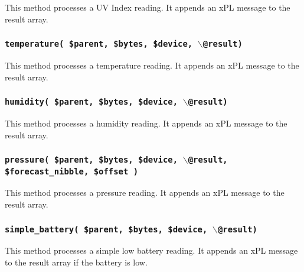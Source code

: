 This method processes a UV Index reading.  It appends an xPL message
to the result array.

\subsubsection*{\texttt{temperature( \$parent, \$bytes, \$device, $\backslash$@result)}\label{xPL::RF::Oregon_temperature_parent_bytes_device_backslash_result_}}


This method processes a temperature reading.  It appends an xPL message
to the result array.

\subsubsection*{\texttt{humidity( \$parent, \$bytes, \$device, $\backslash$@result)}\label{xPL::RF::Oregon_humidity_parent_bytes_device_backslash_result_}}


This method processes a humidity reading.  It appends an xPL message
to the result array.

\subsubsection*{\texttt{pressure( \$parent, \$bytes, \$device, $\backslash$@result, \$forecast\_nibble,
                   \$offset )}\label{xPL::RF::Oregon__texttt_pressure_parent_bytes_device_backslash_result_forecast_nibble_offset_}}


This method processes a pressure reading.  It appends an xPL message
to the result array.

\subsubsection*{\texttt{simple\_battery( \$parent, \$bytes, \$device, $\backslash$@result)}\label{xPL::RF::Oregon_simple_battery_parent_bytes_device_backslash_result_}}


This method processes a simple low battery reading.  It appends an xPL
message to the result array if the battery is low.

